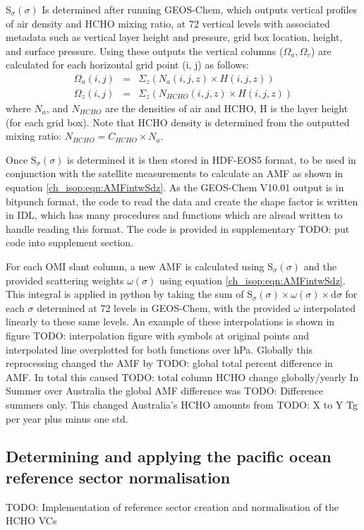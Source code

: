     S$_\sigma(\sigma)$ Is determined after running GEOS-Chem, which outputs vertical profiles of air density and HCHO mixing ratio, at 72 vertical levels with associated metadata such as vertical layer height and pressure, grid box location, height, and surface pressure.
    Using these outputs the vertical columns ($\Omega_a, \Omega_v$) are calculated for each horizontal grid point (i, j) as follows:
    \begin{align*}
      \Omega_a(i,j) &=& \Sigma_z \left( N_a(i,j,z) \times H(i,j,z) \right)
      \\
      \Omega_z(i,j) &=& \Sigma_z \left( N_{HCHO}(i,j,z) \times H(i,j,z) \right)
    \end{align*}
    where $N_a$, and $N_{HCHO}$ are the densities of air and HCHO, H is the layer height (for each grid box).
    Note that HCHO density is determined from the outputted mixing ratio: $N_{HCHO} = C_{HCHO} \times N_a$.

    Once S$_\sigma(\sigma)$ is determined it is then stored in HDF-EOS5 format, to be used in conjunction with the satellite measurements to calculate an AMF as shown in equation \ref{ch_isop:eqn:AMFintwSdz}.
    As the GEOS-Chem V10.01 output is in bitpunch format, the code to read the data and create the shape factor is written in IDL, which has many procedures and functions which are alread written to handle reading this format. The code is provided in supplementary TODO: put code into supplement section.
    
    For each OMI slant column, a new AMF is calculated using S$_\sigma(\sigma)$ and the provided scattering weights $\omega(\sigma)$ using equation \ref{ch_isop:eqn:AMFintwSdz}.
    This integral is applied in python by taking the sum of S$_\sigma(\sigma) \times \omega(\sigma) \times \mathrm{d}\sigma$ for each $\sigma$ determined at 72 levels in GEOS-Chem, with the provided $\omega$ interpolated linearly to these same levels.
    An example of these interpolations is shown in figure TODO: interpolation figure with symbols at original points and interpolated line overplotted for both functions over hPa.
    Globally this reprocessing changed the AMF by TODO: global total percent difference in AMF. 
    In total this caused TODO: total column HCHO change globally/yearly
    In Summer over Australia the global AMF difference was TODO: Difference summers only.
    This changed Australia's HCHO amounts from TODO: X to Y Tg per year plus minus one std.
    
    
    
  \subsection{Determining and applying the pacific ocean reference sector normalisation}
    \label{ch_isop:sec:RSC}
    TODO: \citep{Gonzalez2015} Implementation of reference sector creation and normalisation of the HCHO VCs

